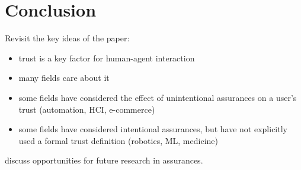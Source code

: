 \section{Conclusion}
    Revisit the key ideas of the paper:

    \begin{itemize}
        \item trust is a key factor for human-agent interaction
        \item many fields care about it
        \item some fields have considered the effect of unintentional assurances on a user's trust (automation, HCI, e-commerce)
        \item some fields have considered intentional assurances, but have not explicitly used a formal trust definition (robotics, ML, medicine)
    \end{itemize}

    discuss opportunities for future research in assurances.

\newpage

